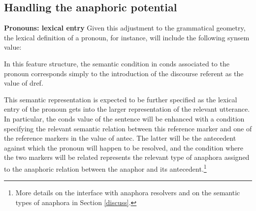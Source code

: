 \documentclass[output=paper
	        ,collection
	        ,collectionchapter
 	        ,biblatex
                ,babelshorthands
                ,newtxmath
                ,draftmode
                ,colorlinks, citecolor=brown
]{langscibook}
\begin{document}
\subsection{Handling the anaphoric potential}

\textbf{Pronouns: lexical entry} Given this adjustment to the grammatical geometry, 
the lexical definition of a pronoun,
for instance, will include the following {\sc synsem} value:

\begin{exe}

\ex\label{pronfeat}
\avmfont{\sc}
\avmvalfont{\it}
\begin{avm}
\end{avm}
\end{exe}





In this feature structure, the semantic condition in {\sc conds} associated
to the pronoun corresponds simply to the introduction of the discourse referent 
\raisebox{-.6ex}{\begin{avm}\@2\end{avm}}
as the value of {\sc dref}.

This semantic representation is expected
to be further specified as the lexical entry of the
pronoun gets into the larger representation of the
relevant utterance. In particular, the {\sc conds} value of the sentence
will be enhanced with a condition specifying the
relevant semantic relation between this reference marker
\raisebox{-.6ex}{\begin{avm}\@2\end{avm}}
and one of the reference markers in the value
\raisebox{-.6ex}{\begin{avm}\@5\end{avm}}
of {\sc antec}. The latter will be the antecedent against
which the pronoun will happen to be resolved, and the
condition where the two markers will be related represents the
relevant type of anaphora assigned to the anaphoric relation
between the anaphor and its antecedent.\footnote{
More details on the interface with anaphora resolvers and on the semantic types of anaphora in Section \ref{discuss}.}
\end{document}
